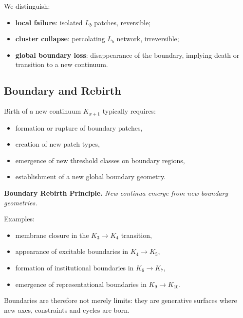 We distinguish:
\begin{itemize}
    \item \textbf{local failure}: isolated \(L_b\) patches, reversible;
    \item \textbf{cluster collapse}: percolating \(L_b\) network, irreversible;
    \item \textbf{global boundary loss}: disappearance of the boundary, implying
          death or transition to a new continuum.
\end{itemize}

\subsection{Boundary and Rebirth}

Birth of a new continuum \(K_{x+1}\) typically requires:
\begin{itemize}
    \item formation or rupture of boundary patches,
    \item creation of new patch types,
    \item emergence of new threshold classes on boundary regions,
    \item establishment of a new global boundary geometry.
\end{itemize}

\textbf{Boundary Rebirth Principle.}
\emph{New continua emerge from new boundary geometries.}

Examples:
\begin{itemize}
    \item membrane closure in the \(K_3 \to K_4\) transition,
    \item appearance of excitable boundaries in \(K_4 \to K_5\),
    \item formation of institutional boundaries in \(K_6 \to K_7\),
    \item emergence of representational boundaries in \(K_9 \to K_{10}\).
\end{itemize}

Boundaries are therefore not merely limits:  
they are generative surfaces where new axes, constraints and cycles are born.
